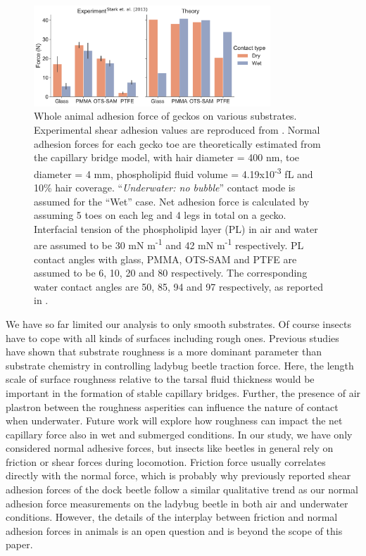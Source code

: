 \documentclass[vruler,JEB]{COB}%
\begin{document}
\begin{figure}
\centering
\includegraphics[width=3.5in]{Figure-9-Gecko_comparison}\caption{\label{fig:Comparison-with-model}Whole animal adhesion force of geckos
on various substrates. Experimental shear adhesion values are reproduced
from \citet{RN15}. Normal adhesion forces for each gecko
toe are theoretically estimated from the capillary bridge model, with
hair diameter = 400 nm, toe diameter = 4 mm, phospholipid fluid volume
= 4.19x10\protect\textsuperscript{-3} fL and 10\% hair coverage.
\textquotedblleft\emph{Underwater: no bubble}\textquotedblright{}
contact mode is assumed for the \textquotedblleft Wet\textquotedblright{}
case. Net adhesion force is calculated by assuming 5 toes on each
leg and 4 legs in total on a gecko. Interfacial tension of the phospholipid
layer (PL) in air and water are assumed to be 30 mN m\protect\textsuperscript{-1} and 42 mN m\protect\textsuperscript{-1}
respectively. PL contact angles with glass, PMMA, OTS-SAM and PTFE
are assumed to be 6\textdegree , 10\textdegree , 20\textdegree{} and
80\textdegree{} respectively. The corresponding water contact angles
are 50\textdegree , 85\textdegree , 94\textdegree{} and 97\textdegree{}
respectively, as reported in \citet{RN15}.}
\end{figure}

We have so far limited our analysis to only smooth substrates. Of course insects
have to cope with all kinds of surfaces including rough ones.
Previous studies \citep{RN136} have shown that substrate roughness
is a more dominant parameter than substrate chemistry in controlling
ladybug beetle traction force. Here, the length scale of surface roughness relative to the tarsal fluid thickness would be important in the formation of stable capillary bridges. Further, the presence of air plastron between the roughness asperities can influence the nature of contact when underwater. Future work will explore how roughness can impact
the net capillary force also in wet and submerged conditions. In our study, we have only considered normal adhesive forces, but insects like beetles in general rely on friction or shear forces during locomotion. Friction force usually correlates directly with the normal force, which is probably why previously reported shear adhesion forces of the dock beetle \citep{RN87} follow a similar qualitative trend as our normal adhesion force measurements on the ladybug beetle in both air and underwater conditions. However, the details of the interplay between friction and normal adhesion forces in animals is an open question and is beyond the scope of this paper. 
\end{document}
